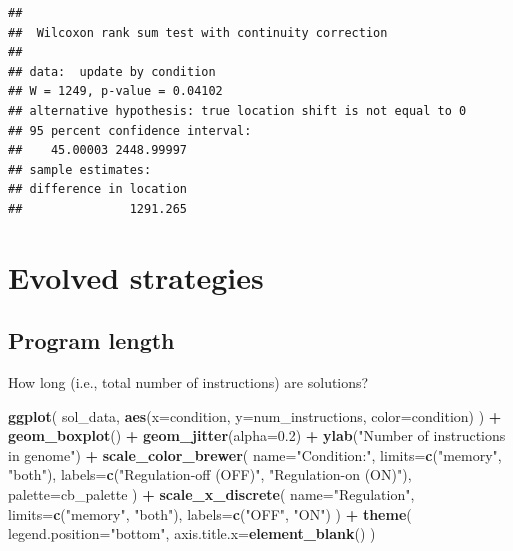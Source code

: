 \documentclass[]{book}
\newenvironment{Shaded}{\begin{snugshade}}{\end{snugshade}}
\newcommand{\DataTypeTok}[1]{\textcolor[rgb]{0.13,0.29,0.53}{#1}}
\newcommand{\FloatTok}[1]{\textcolor[rgb]{0.00,0.00,0.81}{#1}}
\newcommand{\KeywordTok}[1]{\textcolor[rgb]{0.13,0.29,0.53}{\textbf{#1}}}
\newcommand{\NormalTok}[1]{#1}
\newcommand{\OperatorTok}[1]{\textcolor[rgb]{0.81,0.36,0.00}{\textbf{#1}}}
\newcommand{\StringTok}[1]{\textcolor[rgb]{0.31,0.60,0.02}{#1}}
\begin{document}
\begin{verbatim}
## 
##  Wilcoxon rank sum test with continuity correction
## 
## data:  update by condition
## W = 1249, p-value = 0.04102
## alternative hypothesis: true location shift is not equal to 0
## 95 percent confidence interval:
##    45.00003 2448.99997
## sample estimates:
## difference in location 
##               1291.265
\end{verbatim}

\hypertarget{evolved-strategies-1}{%
\section{Evolved strategies}\label{evolved-strategies-1}}

\hypertarget{program-length-2}{%
\subsection{Program length}\label{program-length-2}}

How long (i.e., total number of instructions) are solutions?

\begin{Shaded}
\begin{Highlighting}[]
\KeywordTok{ggplot}\NormalTok{( sol_data, }\KeywordTok{aes}\NormalTok{(}\DataTypeTok{x=}\NormalTok{condition, }\DataTypeTok{y=}\NormalTok{num_instructions, }\DataTypeTok{color=}\NormalTok{condition) ) }\OperatorTok{+}
\StringTok{  }\KeywordTok{geom_boxplot}\NormalTok{() }\OperatorTok{+}
\StringTok{  }\KeywordTok{geom_jitter}\NormalTok{(}\DataTypeTok{alpha=}\FloatTok{0.2}\NormalTok{) }\OperatorTok{+}
\StringTok{  }\KeywordTok{ylab}\NormalTok{(}\StringTok{"Number of instructions in genome"}\NormalTok{) }\OperatorTok{+}
\StringTok{  }\KeywordTok{scale_color_brewer}\NormalTok{(}
    \DataTypeTok{name=}\StringTok{"Condition:"}\NormalTok{,}
    \DataTypeTok{limits=}\KeywordTok{c}\NormalTok{(}\StringTok{"memory"}\NormalTok{, }\StringTok{"both"}\NormalTok{),}
    \DataTypeTok{labels=}\KeywordTok{c}\NormalTok{(}\StringTok{"Regulation-off (OFF)"}\NormalTok{, }\StringTok{"Regulation-on (ON)"}\NormalTok{),}
    \DataTypeTok{palette=}\NormalTok{cb_palette}
\NormalTok{  ) }\OperatorTok{+}
\StringTok{  }\KeywordTok{scale_x_discrete}\NormalTok{(}
    \DataTypeTok{name=}\StringTok{"Regulation"}\NormalTok{,}
    \DataTypeTok{limits=}\KeywordTok{c}\NormalTok{(}\StringTok{"memory"}\NormalTok{, }\StringTok{"both"}\NormalTok{),}
    \DataTypeTok{labels=}\KeywordTok{c}\NormalTok{(}\StringTok{"OFF"}\NormalTok{, }\StringTok{"ON"}\NormalTok{)}
\NormalTok{  ) }\OperatorTok{+}
\StringTok{  }\KeywordTok{theme}\NormalTok{(}
    \DataTypeTok{legend.position=}\StringTok{"bottom"}\NormalTok{,}
    \DataTypeTok{axis.title.x=}\KeywordTok{element_blank}\NormalTok{()}
\NormalTok{  )}
\end{Highlighting}
\end{Shaded}
\end{document}
